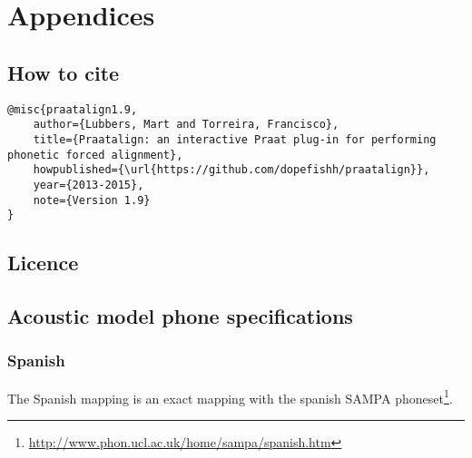 \chapter{Appendices}
\section{How to cite}
\begin{lstlisting}[caption={Bibtex snippet}]
@misc{praatalign1.9,
	author={Lubbers, Mart and Torreira, Francisco},
	title={Praatalign: an interactive Praat plug-in for performing phonetic forced alignment},
	howpublished={\url{https://github.com/dopefishh/praatalign}},
	year={2013-2015},
	note={Version 1.9}
}
\end{lstlisting}

\section{Licence}


\section{Acoustic model phone specifications}\label{sec:models}
\subsection{Spanish}\label{sec:phspanish}
The Spanish mapping is an exact mapping with the spanish SAMPA
phoneset\footnote{\url{http://www.phon.ucl.ac.uk/home/sampa/spanish.htm}}.

